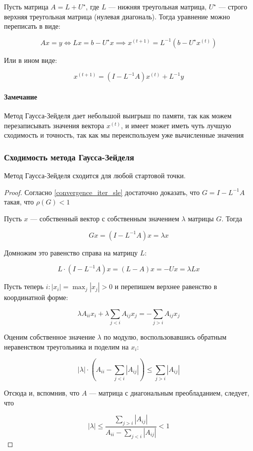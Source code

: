 Пусть матрица $A = L + U^{\star}$, где $L$ --- нижняя треугольная матрица, $U^{\star}$ --- строго верхняя треугольная матрица (нулевая диагональ). Тогда уравнение можно переписать в виде:

\[
Ax = y \iff Lx = b - U^{\star}x \implies x^{(t+1)} = L^{-1} (b - U^{\star} x^{(t)})
\]

Или в ином виде:

\[
x^{(t+1)} = (I - L^{-1} A) x^{(t)} + L^{-1} y
\]

\paragraph{Замечание}

Метод Гаусса-Зейделя дает небольшой выигрыш по памяти, так как можем перезаписывать значения вектора $x^{(t)}$, и имеет может иметь чуть лучшую сходимость и точность, так как мы переиспользуем уже вычисленные значения

\subsubsection*{Сходимость метода Гаусса-Зейделя}

\begin{claim}
    Метод Гаусса-Зейделя сходится для любой стартовой точки.
\end{claim}

\begin{proof}
    Согласно \ref{convergence_iter_sle} достаточно доказать, что $G = I - L^{-1} A$ такая, что $\rho(G) < 1$

    Пусть $x$ --- собственный вектор с собственным значением $\lambda$ матрицы $G$. Тогда

    \[
    Gx = (I - L^{-1} A) x = \lambda x
    \]

    Домножим это равенство справа на матрицу $L$:

    \[
    L \cdot (I - L^{-1} A) x = (L - A) x = -U x = \lambda L x
    \]

    Пусть теперь $i: |x_i| = \max_j |x_j| > 0$ и перепишем верхнее равенство в координатной форме:

    \[
    \lambda A_{ii} x_i + \lambda \sum\limits_{j < i} A_{ij} x_j = - \sum\limits_{j > i} A_{ij} x_j
    \]

    Оценим собственное значение $\lambda$ по модулю, воспользовавшись обратным неравенством треугольника и поделим на $x_i$:

    \[
    |\lambda| \cdot \left(A_{ii} - \sum\limits_{j < i} |A_{ij}| \right) \leqslant \sum\limits_{j > i} |A_{ij}|
    \]

    Отсюда и, вспомнив, что $A$ --- матрица с диагональным преобладанием, следует, что

    \[
    |\lambda| \leqslant \frac{
    \sum_{j > i} |A_{ij}|
    }{
    A_{ii} - \sum_{j < i} |A_{ij}|
    } < 1
    \]
\end{proof}

